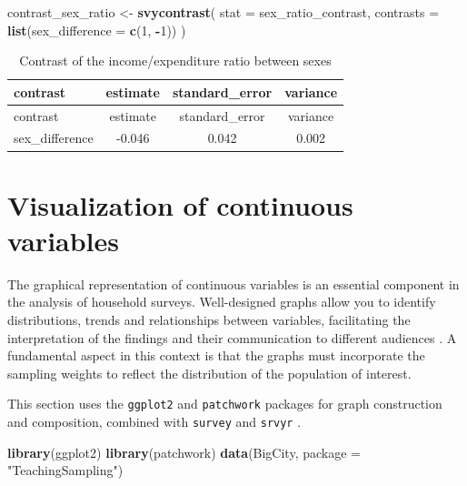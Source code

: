 \documentclass[
  english,
  12pt,
]{book}
\newenvironment{Shaded}{\begin{snugshade}}{\end{snugshade}}
\newcommand{\AttributeTok}[1]{\textcolor[rgb]{0.13,0.29,0.53}{#1}}
\newcommand{\DecValTok}[1]{\textcolor[rgb]{0.00,0.00,0.81}{#1}}
\newcommand{\FunctionTok}[1]{\textcolor[rgb]{0.13,0.29,0.53}{\textbf{#1}}}
\newcommand{\NormalTok}[1]{#1}
\newcommand{\OtherTok}[1]{\textcolor[rgb]{0.56,0.35,0.01}{#1}}
\newcommand{\SpecialCharTok}[1]{\textcolor[rgb]{0.81,0.36,0.00}{\textbf{#1}}}
\newcommand{\StringTok}[1]{\textcolor[rgb]{0.31,0.60,0.02}{#1}}
\begin{document}
\begin{Shaded}
\begin{Highlighting}[]
\NormalTok{contrast\_sex\_ratio }\OtherTok{\textless{}{-}} \FunctionTok{svycontrast}\NormalTok{(}
  \AttributeTok{stat =}\NormalTok{ sex\_ratio\_contrast,}
  \AttributeTok{contrasts =} \FunctionTok{list}\NormalTok{(}\AttributeTok{sex\_difference =} \FunctionTok{c}\NormalTok{(}\DecValTok{1}\NormalTok{, }\SpecialCharTok{{-}}\DecValTok{1}\NormalTok{))}
\NormalTok{)}
\end{Highlighting}
\end{Shaded}

\begin{longtable}[]{@{}lccc@{}}
\caption{\label{tab:tab-contraste-razon-sexo}Contrast of the income/expenditure ratio between sexes}\tabularnewline
\toprule\noalign{}
contrast & estimate & standard\_error & variance \\
\midrule\noalign{}
\endfirsthead
\toprule\noalign{}
contrast & estimate & standard\_error & variance \\
\midrule\noalign{}
\endhead
\bottomrule\noalign{}
\endlastfoot
sex\_difference & -0.046 & 0.042 & 0.002 \\
\end{longtable}

\section{Visualization of continuous variables}\label{viz-continuas}

The graphical representation of continuous variables is an essential component in the analysis of household surveys. Well-designed graphs allow you to identify distributions, trends and relationships between variables, facilitating the interpretation of the findings and their communication to different audiences \citep{wilkinson2005grammar}. A fundamental aspect in this context is that the graphs must incorporate the sampling weights to reflect the distribution of the population of interest.

This section uses the \texttt{ggplot2} \citep{ggplot22026} and \texttt{patchwork} \citep{patchwork} packages for graph construction and composition, combined with \texttt{survey} \citep{Lumley2024} and \texttt{srvyr} \citep{Freedman2024}.

\begin{Shaded}
\begin{Highlighting}[]
\FunctionTok{library}\NormalTok{(ggplot2)}
\FunctionTok{library}\NormalTok{(patchwork)}
\FunctionTok{data}\NormalTok{(BigCity, }\AttributeTok{package =} \StringTok{"TeachingSampling"}\NormalTok{)}
\end{Highlighting}
\end{Shaded}
\end{document}
